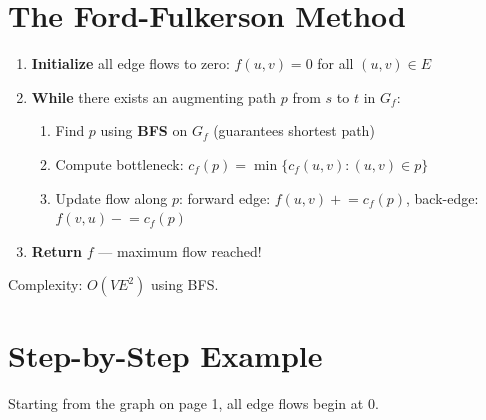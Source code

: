 \documentclass[10pt,a4paper]{article}
\newcommand{\cf}{c_f}
\newcommand{\Gf}{G_f}
\begin{document}
\section{The Ford-Fulkerson Method}

\begin{algbox}
\begin{enumerate}
  \item \textbf{Initialize} all edge flows to zero: $f(u,v) = 0$ for all $(u,v) \in E$
  \item \textbf{While} there exists an augmenting path $p$ from $s$ to $t$ in $\Gf$:
  \begin{enumerate}[label=(\alph*)]
    \item Find $p$ using \textbf{BFS} on $\Gf$ (guarantees shortest path)
    \item Compute bottleneck: $\cf(p) = \min\{\cf(u,v) : (u,v) \in p\}$
    \item Update flow along $p$:
      \quad forward edge: $f(u,v) \mathrel{+}= \cf(p)$,
      \quad back-edge: $f(v,u) \mathrel{-}= \cf(p)$
  \end{enumerate}
  \item \textbf{Return} $f$ --- maximum flow reached!
\end{enumerate}
\vspace{2pt}
{\small\color{accent} Complexity: $O(VE^2)$ using BFS.}
\end{algbox}

\newpage

\section{Step-by-Step Example}

Starting from the graph on page 1, all edge flows begin at $0$.
\end{document}
